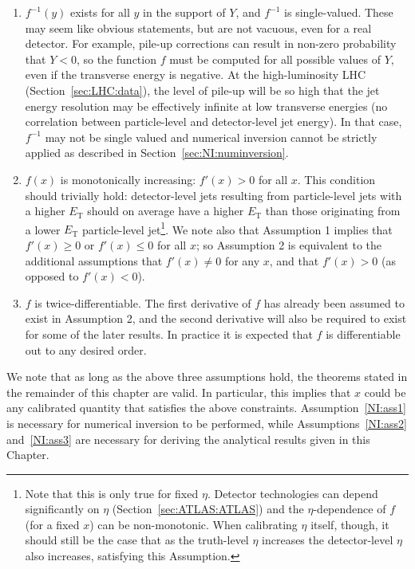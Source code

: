 \begin{enumerate}
  \item $f^{-1}(y)$ exists for all $y$ in the support of $Y$, and $f^{-1}$ is single-valued.  These may seem like obvious statements, but are not vacuous, even for a real detector.  For example, pile-up corrections can result in non-zero probability that $Y<0$, so the function $f$ must be computed for all possible values of $Y$, even if the transverse energy is negative.  At the high-luminosity LHC (Section~\ref{sec:LHC:data}), the level of pile-up will be so high that the jet energy resolution may be effectively infinite at low transverse energies (no correlation between particle-level and detector-level jet energy).  In that case, $f^{-1}$ may not be single valued and numerical inversion cannot be strictly applied as described in Section~\ref{sec:NI:numinversion}.
    \label{NI:ass1}
  \item $f(x)$ is monotonically increasing: $f'(x)>0$ for all $x$.  This condition should trivially hold: detector-level jets resulting from particle-level jets with a higher $E_\text{T}$ should on average have a higher $E_\text{T}$ than those originating from a lower $E_\text{T}$ particle-level jet\footnote{Note that this is only true for fixed $\eta$. Detector technologies can depend significantly on $\eta$ (Section~\ref{sec:ATLAS:ATLAS}) and the $\eta$-dependence of $f$ (for a fixed $x$) can be non-monotonic. When calibrating $\eta$ itself, though, it should still be the case that as the truth-level $\eta$ increases the detector-level $\eta$ also increases, satisfying this Assumption.}. We note also that Assumption 1 implies that $f'(x)\ge 0$ or $f'(x) \le 0$ for all $x$; so Assumption 2 is equivalent to the additional assumptions that $f'(x)\ne 0$ for any $x$, and that $f'(x)>0$ (as opposed to $f'(x)<0$).
    \label{NI:ass2}
\item $f$ is twice-differentiable. The first derivative of $f$ has already been assumed to exist in Assumption 2, and the second derivative will also be required to exist for some of the later results. In practice it is expected that $f$ is differentiable out to any desired order.
    \label{NI:ass3}
\end{enumerate}

We note that as long as the above three assumptions hold, the theorems stated in the remainder of this chapter are valid.
In particular, this implies that $x$ could be any calibrated quantity that satisfies the above constraints.
Assumption~\ref{NI:ass1} is necessary for numerical inversion to be performed, while Assumptions~\ref{NI:ass2} and~\ref{NI:ass3} are necessary for deriving the analytical results given in this Chapter.

